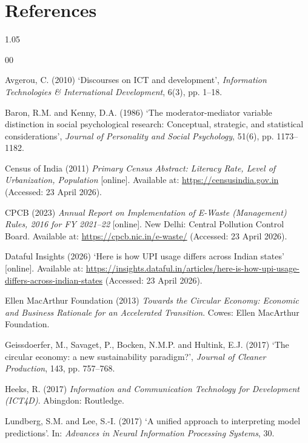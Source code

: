 \documentclass[10pt,a4paper]{article}
\begin{document}
\section*{References}
\begin{spacing}{1.05}
\begin{thebibliography}{00}

Avgerou, C. (2010) `Discourses on ICT and development', \textit{Information Technologies \& International Development}, 6(3), pp. 1--18.

Baron, R.M. and Kenny, D.A. (1986) `The moderator-mediator variable distinction in social psychological research: Conceptual, strategic, and statistical considerations', \textit{Journal of Personality and Social Psychology}, 51(6), pp. 1173--1182.

Census of India (2011) \textit{Primary Census Abstract: Literacy Rate, Level of Urbanization, Population} [online]. Available at: \url{https://censusindia.gov.in} (Accessed: 23 April 2026).

CPCB (2023) \textit{Annual Report on Implementation of E-Waste (Management) Rules, 2016 for FY 2021--22} [online]. New Delhi: Central Pollution Control Board. Available at: \url{https://cpcb.nic.in/e-waste/} (Accessed: 23 April 2026).

Dataful Insights (2026) `Here is how UPI usage differs across Indian states' [online]. Available at: \url{https://insights.dataful.in/articles/here-is-how-upi-usage-differs-across-indian-states} (Accessed: 23 April 2026).

Ellen MacArthur Foundation (2013) \textit{Towards the Circular Economy: Economic and Business Rationale for an Accelerated Transition}. Cowes: Ellen MacArthur Foundation.

Geissdoerfer, M., Savaget, P., Bocken, N.M.P. and Hultink, E.J. (2017) `The circular economy: a new sustainability paradigm?', \textit{Journal of Cleaner Production}, 143, pp. 757--768.

Heeks, R. (2017) \textit{Information and Communication Technology for Development (ICT4D)}. Abingdon: Routledge.

Lundberg, S.M. and Lee, S.-I. (2017) `A unified approach to interpreting model predictions'. In: \textit{Advances in Neural Information Processing Systems}, 30.


\end{thebibliography}
\end{spacing}
\end{document}
